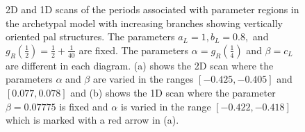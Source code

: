 \begin{figure}
	\centering
	\caption[2D and 1D scans of the periods associated with parameter regions in the archetypal model with increasing branches showing vertically oriented period-adding-like structures]{
		2D and 1D scans of the periods associated with parameter regions in the archetypal model with increasing branches showing vertically oriented \gls{pal} structures.
		The parameters $a_L = 1, b_L = 0.8,$ and $g_R\left(\frac{1}{2}\right) = \frac{1}{2} + \frac{1}{40}$ are fixed.
		The parameters $\alpha = g_R\left(\frac{1}{4}\right)$ and $\beta = c_L$ are different in each diagram.
		(a) shows the 2D scan where the parameters $\alpha$ and $\beta$ are varied in the ranges $[-0.425, -0.405]$ and $[0.077, 0.078]$
		and (b) shows the 1D scan where the parameter $\beta = 0.07775$ is fixed and $\alpha$ is varied in the range $[-0.422, -0.418]$ which is marked with a red arrow in (a).
	}
	\label{fig:add.add.like.vert}
\end{figure}

